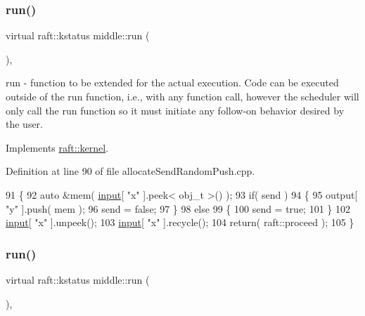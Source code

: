 \subsubsection{\texorpdfstring{run()}{run()}\hspace{0.1cm}{\footnotesize\ttfamily [2/4]}}
{\footnotesize\ttfamily virtual raft\+::kstatus middle\+::run (\begin{DoxyParamCaption}{ }\end{DoxyParamCaption})\hspace{0.3cm}{\ttfamily [inline]}, {\ttfamily [virtual]}}

run -\/ function to be extended for the actual execution. Code can be executed outside of the run function, i.\+e., with any function call, however the scheduler will only call the run function so it must initiate any follow-\/on behavior desired by the user. 

Implements \hyperlink{classraft_1_1kernel_a05094286d7577360fb1b91c91fc05901}{raft\+::kernel}.



Definition at line 90 of file allocate\+Send\+Random\+Push.\+cpp.


\begin{DoxyCode}
91     \{
92         \textcolor{keyword}{auto} &mem( \hyperlink{classraft_1_1kernel_a6edbe35a56409d402e719b3ac36d6554}{input}[ \textcolor{stringliteral}{"x"} ].peek< obj\_t >() );
93         \textcolor{keywordflow}{if}( send )
94         \{
95             output[ \textcolor{stringliteral}{"y"} ].push( mem );
96             send = \textcolor{keyword}{false};
97         \}
98         \textcolor{keywordflow}{else}
99         \{
100             send = \textcolor{keyword}{true};
101         \}
102         \hyperlink{classraft_1_1kernel_a6edbe35a56409d402e719b3ac36d6554}{input}[ \textcolor{stringliteral}{"x"} ].unpeek();
103         \hyperlink{classraft_1_1kernel_a6edbe35a56409d402e719b3ac36d6554}{input}[ \textcolor{stringliteral}{"x"} ].recycle();
104         \textcolor{keywordflow}{return}( raft::proceed );
105     \}
\end{DoxyCode}
\hypertarget{classmiddle_a9aa7415c102af751be9c7af4771b6f16}{}\label{classmiddle_a9aa7415c102af751be9c7af4771b6f16} 
\subsubsection{\texorpdfstring{run()}{run()}\hspace{0.1cm}{\footnotesize\ttfamily [3/4]}}
{\footnotesize\ttfamily virtual raft\+::kstatus middle\+::run (\begin{DoxyParamCaption}{ }\end{DoxyParamCaption})\hspace{0.3cm}{\ttfamily [inline]}, {\ttfamily [virtual]}}

